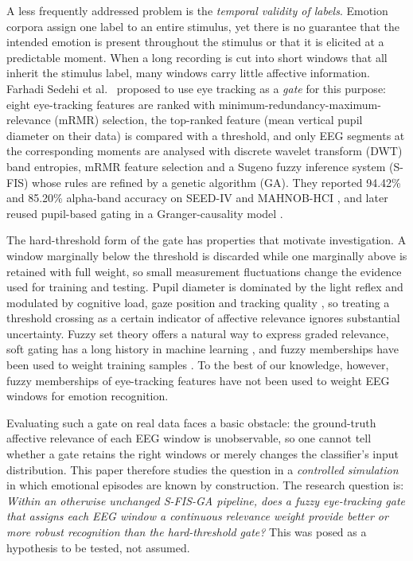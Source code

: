 \documentclass[11pt,a4paper]{article}
\begin{document}
A less frequently addressed problem is the \emph{temporal validity of labels}. Emotion corpora assign one label to an entire stimulus, yet there is no guarantee that the intended emotion is present throughout the stimulus or that it is elicited at a predictable moment. When a long recording is cut into short windows that all inherit the stimulus label, many windows carry little affective information. Farhadi Sedehi et al.\ \cite{FarhadiSedehi2024a} proposed to use eye tracking as a \emph{gate} for this purpose: eight eye-tracking features are ranked with minimum-redundancy-maximum-relevance (mRMR) selection, the top-ranked feature (mean vertical pupil diameter on their data) is compared with a threshold, and only EEG segments at the corresponding moments are analysed with discrete wavelet transform (DWT) band entropies, mRMR feature selection and a Sugeno fuzzy inference system (S-FIS) whose rules are refined by a genetic algorithm (GA). They reported 94.42\% and 85.20\% alpha-band accuracy on SEED-IV and MAHNOB-HCI \cite{FarhadiSedehi2024a}, and later reused pupil-based gating in a Granger-causality model \cite{FarhadiSedehi2024b}.

The hard-threshold form of the gate has properties that motivate investigation. A window marginally below the threshold is discarded while one marginally above is retained with full weight, so small measurement fluctuations change the evidence used for training and testing. Pupil diameter is dominated by the light reflex and modulated by cognitive load, gaze position and tracking quality \cite{Mathot2018,Raiturkar2016,Holmqvist2012}, so treating a threshold crossing as a certain indicator of affective relevance ignores substantial uncertainty. Fuzzy set theory \cite{Zadeh1965} offers a natural way to express graded relevance, soft gating has a long history in machine learning \cite{Jacobs1991,Arevalo2020}, and fuzzy memberships have been used to weight training samples \cite{LinWang2002}. To the best of our knowledge, however, fuzzy memberships of eye-tracking features have not been used to weight EEG windows for emotion recognition.

Evaluating such a gate on real data faces a basic obstacle: the ground-truth affective relevance of each EEG window is unobservable, so one cannot tell whether a gate retains the right windows or merely changes the classifier's input distribution. This paper therefore studies the question in a \emph{controlled simulation} in which emotional episodes are known by construction. The research question is: \emph{Within an otherwise unchanged S-FIS-GA pipeline, does a fuzzy eye-tracking gate that assigns each EEG window a continuous relevance weight provide better or more robust recognition than the hard-threshold gate?} This was posed as a hypothesis to be tested, not assumed.
\end{document}
